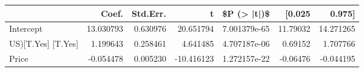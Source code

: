 \begin{tabular}{lrrrrrr}
\toprule
{} &      Coef. &  Std.Err. &          t &   \$P (> |t|)\$ &    [0.025 &     0.975] \\
\midrule
Intercept          &  13.030793 &  0.630976 &  20.651794 &  7.001379e-65 &  11.79032 &  14.271265 \\
US)[T.Yes] [T.Yes] &   1.199643 &  0.258461 &   4.641485 &  4.707187e-06 &   0.69152 &   1.707766 \\
Price              &  -0.054478 &  0.005230 & -10.416123 &  1.272157e-22 &  -0.06476 &  -0.044195 \\
\bottomrule
\end{tabular}
